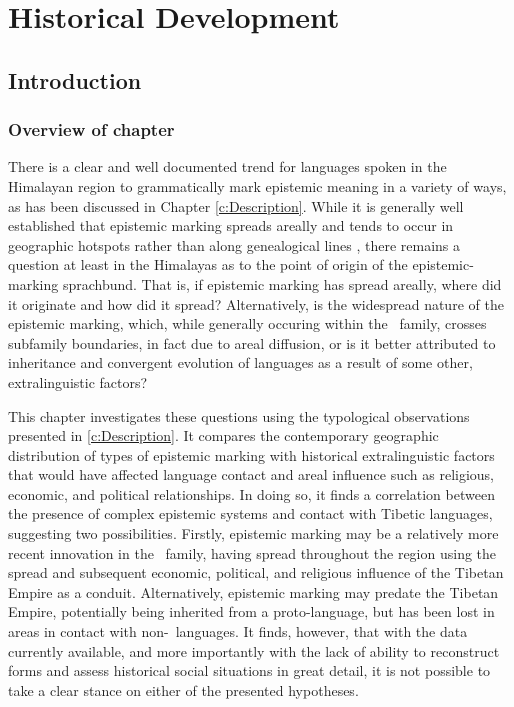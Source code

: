 \chapter{Historical Development}\label{c:History}
\section{Introduction}
\subsection{Overview of chapter}
There is a clear and well documented trend for languages spoken in the Himalayan region to grammatically mark epistemic meaning in a variety of ways, as has been discussed in Chapter \ref{c:Description}. While it is generally well established that epistemic marking spreads areally and tends to occur in geographic hotspots rather than along genealogical lines \cites[288]{Aikhenvald2004}{SanRoque2012}{Verhees2018}, there remains a question at least in the Himalayas as to the point of origin of the epistemic-marking sprachbund. That is, if epistemic marking has spread areally, where did it originate and how did it spread? Alternatively, is the widespread nature of the epistemic marking, which, while generally occuring within the \lfam\ family, crosses subfamily boundaries, in fact due to areal diffusion, or is it better attributed to inheritance and convergent evolution of languages as a result of some other, extralinguistic factors?

This chapter investigates these questions using the typological observations presented in \cref{c:Description}. It compares the contemporary geographic distribution of types of epistemic marking with historical extralinguistic factors that would have affected language contact and areal influence such as religious, economic, and political relationships. In doing so, it finds a correlation between the presence of complex epistemic systems and contact with Tibetic languages, suggesting two possibilities. Firstly, epistemic marking may be a relatively more recent innovation in the \lfam\ family, having spread throughout the region using the spread and subsequent economic, political, and religious influence of the Tibetan Empire as a conduit. Alternatively, epistemic marking may predate the Tibetan Empire, potentially being inherited from a proto-language, but has been lost in areas in contact with non-\lfam\ languages. It finds, however, that with the data currently available, and more importantly with the lack of ability to reconstruct forms and assess historical social situations in great detail, it is not possible to take a clear stance on either of the presented hypotheses.

